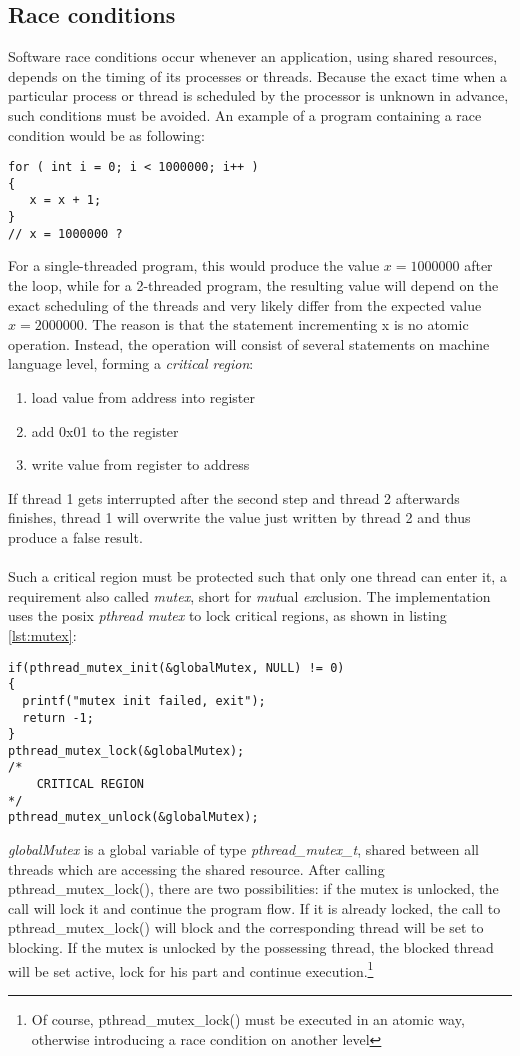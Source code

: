 \subsection{Race conditions}
Software race conditions occur whenever an application, using shared resources, depends on the timing of its processes or threads.
Because the exact time when a particular process or thread is scheduled by the processor is unknown in advance, such conditions must be avoided.
An example of a program containing a race condition would be as following:
\begin{lstlisting}[style=cStyle,caption={Race condition},label=lst:raceCond]
for ( int i = 0; i < 1000000; i++ )
{
   x = x + 1; 
}
// x = 1000000 ?
\end{lstlisting}
For a single-threaded program, this would produce the value $x=1000000$ after the loop, while for a 2-threaded program, the resulting value will depend on the exact scheduling of the
threads and very likely differ from the expected value $x=2000000$. The reason is that the statement incrementing x is no atomic operation. Instead, the operation will consist of
several statements on machine language level, forming a \textit{critical region}:
\begin{enumerate}
 \item load value from address into register
 \item add 0x01 to the register
 \item write value from register to address
\end{enumerate}
If thread 1 gets interrupted after the second step and thread 2 afterwards finishes, thread 1 will overwrite the value just written by thread 2 and thus produce a false result.
\\
\\
Such a critical region must be protected such that only one thread can enter it, a requirement also called \textit{mutex}, short for \textit{mut}ual \textit{ex}clusion.
The implementation uses the \gls{posix} \textit{pthread mutex} to lock critical regions, as shown in listing \ref{lst:mutex}:  
\begin{lstlisting}[style=cStyle,caption={Locking a critical region},label=lst:mutex]
if(pthread_mutex_init(&globalMutex, NULL) != 0)
{
  printf("mutex init failed, exit");
  return -1;
}
pthread_mutex_lock(&globalMutex);
/*
    CRITICAL REGION
*/
pthread_mutex_unlock(&globalMutex);
\end{lstlisting}
\textit{globalMutex} is a global variable of type \textit{pthread\_mutex\_t}, shared between all threads which are accessing the shared resource. After calling pthread\_mutex\_lock(),
there are two possibilities: if the mutex is unlocked, the call will lock it and continue the program flow. If it is already locked, the call to pthread\_mutex\_lock() will block and
the corresponding thread will be set to blocking.
If the mutex is unlocked by the possessing thread, the blocked thread will be set active, lock for his part and continue execution.\footnote{Of course, pthread\_mutex\_lock() must
be executed in an atomic way, otherwise introducing a race condition on another level}

